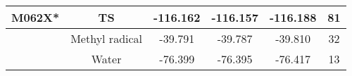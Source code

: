 \begin{tabular}{|c|c|c|c|c|c|}
    \multicolumn{1}{|c|}{M062X*}                                                   & TS                                   & -116.162                            & -116.157                           & -116.188                           & 81               \\ \hline
                                                                                   & Methyl radical                       & -39.791                             & -39.787                            & -39.810                            & 32               \\ \hline
                                                                                   & Water                                & -76.399                             & -76.395                            & -76.417                            & 13               \\ \hline
    \end{tabular}
